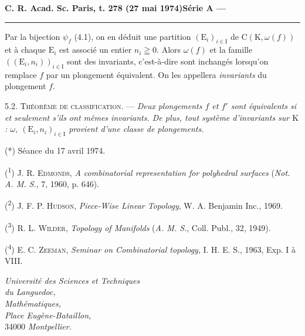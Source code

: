 \textbf{C. R. Acad. Sc. Paris, t. 278 (27 mai 1974)}\hfill\textbf{Série A ---}\par\noindent\rule{\linewidth}{.35pt}\par

Par la bijection \(\psi_f\) (4.1), on en déduit une partition \((\mathrm{E}_i)_{i\in\mathrm{I}}\) de \(\mathrm{C}(\mathrm{K},\omega(f))\) et à chaque \(\mathrm{E}_i\) est associé un entier \(n_i\geqq0\). Alors \(\omega(f)\) et la famille \(((\mathrm{E}_i,n_i))_{i\in\mathrm{I}}\) sont des invariants, c'est-à-dire sont inchangés lorsqu'on remplace \(f\) par un plongement équivalent. On les appellera \textit{invariants} du plongement \(f\).

5.2. \textsc{Théorème de classification.} --- \textit{Deux plongements \(f\) et \(f'\) sont équivalents si et seulement s'ils ont mêmes invariants. De plus, tout système d'invariants sur \(\mathrm{K}\) : \(\omega,\ (\mathrm{E}_i,n_i)_{i\in\mathrm{I}}\) provient d'une classe de plongements.}

{\small (*) Séance du 17 avril 1974.

(\textsuperscript{1}) J. R. \textsc{Edmonds}, \textit{A combinatorial representation for polyhedral surfaces} (\textit{Not. A. M. S.}, 7, 1960, p. 646).

(\textsuperscript{2}) J. F. P. \textsc{Hudson}, \textit{Piece-Wise Linear Topology}, W. A. Benjamin Inc., 1969.

(\textsuperscript{3}) R. L. \textsc{Wilder}, \textit{Topology of Manifolds} (\textit{A. M. S.}, Coll. Publ., 32, 1949).

(\textsuperscript{4}) E. C. \textsc{Zeeman}, \textit{Seminar on Combinatorial topology}, I. H. E. S., 1963, Exp. I à VIII.}

\begin{flushright}
\textit{Université des Sciences et Techniques}\\
\textit{du Languedoc,}\\
\textit{Mathématiques,}\\
\textit{Place Eugène-Bataillon,}\\
34000 \textit{Montpellier.}
\end{flushright}

